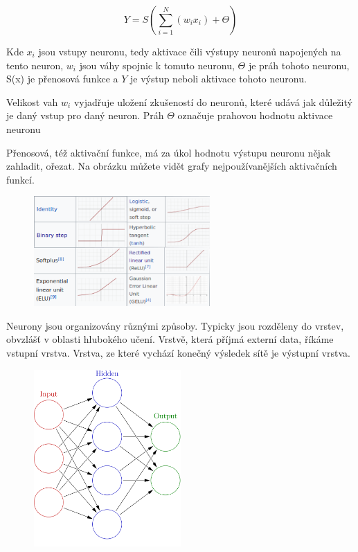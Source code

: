 \documentclass[a4paper,11pt, oneside]{book} \usepackage[czech]{babel}
\begin{document}
	\[Y = S(\sum_{i=1}^{N}(w_i x_i) + \Theta ) \]

	Kde \(x_i\) jsou vstupy neuronu, tedy aktivace čili výstupy neuronů napojených
	na tento neuron, \(w_i\) jsou váhy spojnic k tomuto neuronu, \(\Theta\) je práh tohoto neuronu,
	S(x) je přenosová funkce a \(Y\) je výstup neboli aktivace tohoto neuronu.

	Velikost vah \(w_i\) vyjadřuje uložení zkušeností do neuronů, které udává jak důležitý je daný vstup
	pro daný neuron. Práh \(\Theta\) označuje prahovou hodnotu aktivace neuronu


	Přenosová, též aktivační funkce, má za úkol hodnotu výstupu neuronu nějak zahladit, ořezat.
	Na obrázku můžete vidět grafy nejpoužívanějších aktivačních funkcí.

	\begin{figure}[h]
	\includegraphics[width=0.6\textwidth]{img/activation-functions.png}
	\centering
	\end{figure}




	Neurony jsou organizovány různými způsoby. Typicky jsou rozděleny do vrstev, obvzlášť v oblasti
	hlubokého učení. Vrstvě, která příjmá externí data, říkáme vstupní vrstva. Vrstva, ze které vychází
	konečný výsledek sítě je výstupní vrstva.

	\begin{figure}[h]
	\includegraphics[width=0.5\textwidth]{img/Colored_neural_network.png}
	\centering
	\end{figure}
\end{document}
